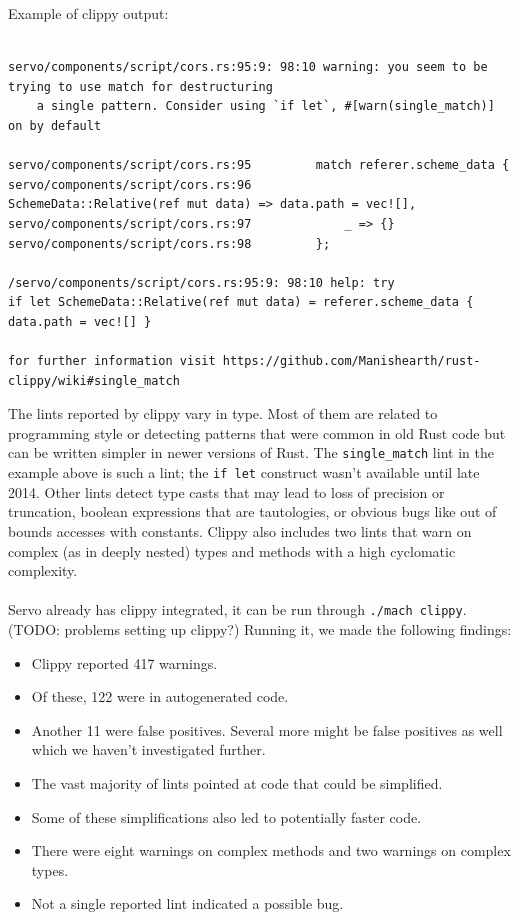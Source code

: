 \documentclass{scrartcl}
\newcommand{\todo}[1] {{\color{red}(TODO: #1)}}
\begin{document}
Example of clippy output:
{
\scriptsize
\begin{verbatim}

servo/components/script/cors.rs:95:9: 98:10 warning: you seem to be trying to use match for destructuring
    a single pattern. Consider using `if let`, #[warn(single_match)] on by default
    
servo/components/script/cors.rs:95         match referer.scheme_data {
servo/components/script/cors.rs:96             SchemeData::Relative(ref mut data) => data.path = vec![],
servo/components/script/cors.rs:97             _ => {}
servo/components/script/cors.rs:98         };

/servo/components/script/cors.rs:95:9: 98:10 help: try
if let SchemeData::Relative(ref mut data) = referer.scheme_data { data.path = vec![] }

for further information visit https://github.com/Manishearth/rust-clippy/wiki#single_match

\end{verbatim}
}

The lints reported by clippy vary in type. Most of them are related to programming style or detecting patterns that were common in old Rust code but can be written simpler in newer versions of Rust. The \texttt{single\_match} lint in the example above is such a lint; the \texttt{if let} construct wasn't available until late 2014. Other lints detect type casts that may lead to loss of precision or truncation, boolean expressions that are tautologies, or obvious bugs like out of bounds accesses with constants. Clippy also includes two lints that warn on complex (as in deeply nested) types and methods with a high cyclomatic complexity.\\
\\
Servo already has clippy integrated, it can be run through \texttt{./mach clippy}. \todo{problems setting up clippy?} Running it, we made the following findings: 
\begin{itemize}
	\item Clippy reported 417 warnings.
    \item Of these, 122 were in autogenerated code.
    \item Another 11 were false positives. Several more might be false positives as well which we haven't investigated further.
    \item The vast majority of lints pointed at code that could be simplified.
    \item Some of these simplifications also led to potentially faster code.
    \item There were eight warnings on complex methods and two warnings on complex types.
    \item Not a single reported lint indicated a possible bug.
\end{itemize}
\end{document}
